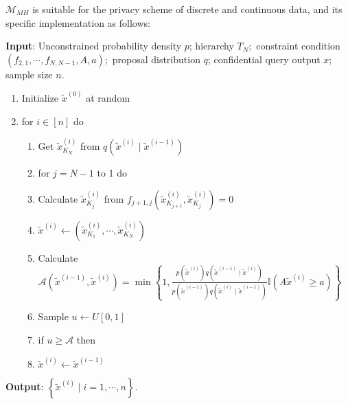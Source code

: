 \documentclass[11pt]{article}
\begin{document}
$\mathcal{M}_{M H}$ is suitable for the privacy scheme of discrete and continuous data, and its specific implementation as follows:
\begin{algorithm}[htb] 
  \caption{$\mathcal{M}_{M H}$} \label{alg:k-means}
\textbf{Input}: Unconstrained probability density $p$; hierarchy $T_{N} ;$ constraint condition $\left(f_{2,1}, \cdots, f_{N, N-1}, A, a\right) ;$ proposal distribution $q$; confidential query output $x$; sample size $n$.

\begin{enumerate}
	\item  Initialize $\tilde{x}^{(0)}$ at random
	\item for $i\in [n]$ do
	 \begin{enumerate}
	\item Get $\tilde{x}_{K_{N}}^{(i)}$ from $q\left(\tilde{x}^{(i)} \mid \tilde{x}^{(i-1)}\right)$

  \item for $j=N-1$ to 1 do
         \item \qquad Calculate $\tilde{x}_{K_{j}}^{(i)}$ from $f_{j+1, j}\left(\tilde{x}_{K_{j+1}}^{(i)}, \tilde{x}_{K_{j}}^{(i)}\right)=0$
    \item $\tilde{x}^{(i)} \leftarrow\left(\tilde{x}_{K_{1}}^{(i)}, \cdots, \tilde{x}_{K_{N}}^{(i)}\right)$

    \item Calculate $\mathcal{A}\left(\tilde{x}^{(i-1)}, \tilde{x}^{(i)}\right)=\min \left\{1, \frac{p\left(\tilde{x}^{(i)}\right) q\left(\tilde{x}^{(i-1)} \mid \tilde{x}^{(i)}\right)}{p\left(\tilde{x}^{(i-1)}\right) q\left(\tilde{x}^{(i)} \mid \tilde{x}^{(i-1)}\right)} \mathbb{I}\left(A \tilde{x}^{(i)} \geq a\right)\right\}$

    \item Sample $u \leftarrow U[0,1]$
  

    \item if $u \geq \mathcal{A}$ then
        \item \qquad $\tilde{x}^{(i)} \leftarrow \tilde{x}^{(i-1)}$

    \end{enumerate}
\end{enumerate}

\textbf{Output}: $\left\{\tilde{x}^{(i)} \mid i=1, \cdots, n\right\}$.
\end{algorithm}
\end{document}

